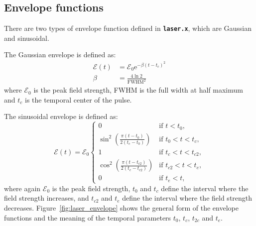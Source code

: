 \documentclass[a4paper,10pt,DIV=15,openany,twoside=false]{scrbook}
\newcommand{\ttt}[1]{\textbf{\texttt{#1}}}
\newcommand{\E}{\ensuremath{\mathrm{e}}}
\begin{document}
\subsection{Envelope functions}

There are two types of envelope function defined in \ttt{laser.x}, which are Gaussian and sinusoidal.

The Gaussian envelope is defined as:
\begin{align}
  \mathcal{E}(t)&=\mathcal{E}_0 \E^{-\beta(t-t_c)^2}\label{eq:laser_gauss_1}\\
  \beta&=\frac{4\ln 2}{\mathrm{FWHM}^2}\label{eq:laser_gauss_2}
\end{align}
where $\mathcal{E}_0$ is the peak field strength, FWHM is the full width at half maximum and $t_c$ is the temporal center of the pulse.

The sinusoidal envelope is defined as:
\begin{equation}
  \mathcal{E}(t)=\mathcal{E}_0
  \begin{cases}
    0                                                   &\text{if } t<t_0,\\
    \sin^2\left(\frac{\pi(t-t_0)}{2(t_c-t_0)}\right)      &\text{if } t_0<t<t_c,\\
    1                                                   &\text{if } t_c<t<t_{c2},\\
    \cos^2\left(\frac{\pi(t-t_{c2})}{2(t_e-t_{c2})}\right)      &\text{if } t_{c2}<t<t_e,\\
    0                                                   &\text{if } t_e<t,\label{eq:laser_sinus}
  \end{cases}
\end{equation}
where again $\mathcal{E}_0$ is the peak field strength, $t_0$ and $t_c$ define the interval where the field strength increases, and $t_{c2}$ and $t_e$ define the interval where the field strength decreases. Figure~\ref{fig:laser_envelope} shows the general form of the envelope functions and the meaning of the temporal parameters $t_0$, $t_c$, $t_{2c}$ and $t_e$.
\end{document}
